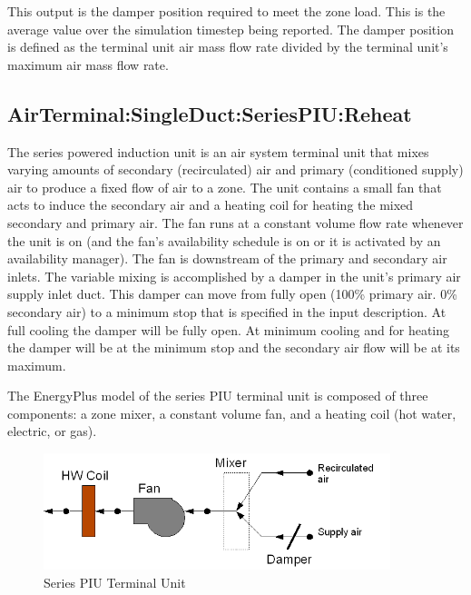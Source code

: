This output is the damper position required to meet the zone load. This is the average value over the simulation timestep being reported. The damper position is defined as the terminal unit air mass flow rate divided by the terminal unit's maximum air mass flow rate.

\subsection{AirTerminal:SingleDuct:SeriesPIU:Reheat}\label{airterminalsingleductseriespiureheat}

The series powered induction unit is an air system terminal unit that mixes varying amounts of secondary (recirculated) air and primary (conditioned supply) air to produce a fixed flow of air to a zone. The unit contains a small fan that acts to induce the secondary air and a heating coil for heating the mixed secondary and primary air. The fan runs at a constant volume flow rate whenever the unit is on (and the fan's availability schedule is on or it is activated by an availability manager). The fan is downstream of the primary and secondary air inlets. The variable mixing is accomplished by a damper in the unit's primary air supply inlet duct. This damper can move from fully open (100\% primary air. 0\% secondary air) to a minimum stop that is specified in the input description. At full cooling the damper will be fully open. At minimum cooling and for heating the damper will be at the minimum stop and the secondary air flow will be at its maximum.

The EnergyPlus model of the series PIU terminal unit is composed of three components: a zone mixer, a constant volume fan, and a heating coil (hot water, electric, or gas).

\begin{figure}[hbtp] %
\centering
\includegraphics[width=0.9\textwidth, height=0.9\textheight, keepaspectratio=true]{media/image269.png}
\caption{Series PIU Terminal Unit \protect \label{fig:series-piu-terminal-unit}}
\end{figure}

